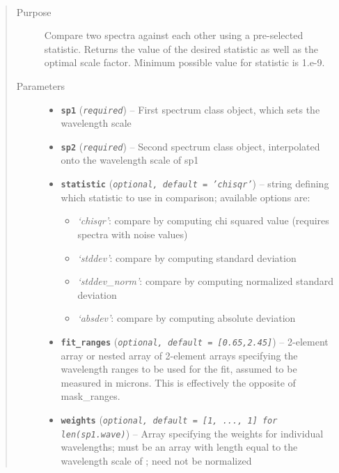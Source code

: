 \documentclass[letterpaper,10pt,english]{sphinxmanual}
\begin{document}
\begin{fulllineitems}
\label{api:splat.compareSpectra}~\begin{quote}\begin{description}
\item[{Purpose}] \leavevmode
Compare two spectra against each other using a pre-selected statistic. Returns the value of the desired statistic as well as the optimal scale factor. Minimum possible value for statistic is 1.e-9.

\item[{Parameters}] \leavevmode\begin{itemize}
\item {} 
\textbf{\texttt{sp1}} (\emph{\texttt{required}}) -- First spectrum class object, which sets the wavelength scale

\item {} 
\textbf{\texttt{sp2}} (\emph{\texttt{required}}) -- Second spectrum class object, interpolated onto the wavelength scale of sp1

\item {} 
\textbf{\texttt{statistic}} (\emph{\texttt{optional, default = 'chisqr'}}) -- 
string defining which statistic to use in comparison; available options are:
\begin{itemize}
\item {} 
\emph{`chisqr'}: compare by computing chi squared value (requires spectra with noise values)

\item {} 
\emph{`stddev'}: compare by computing standard deviation

\item {} 
\emph{`stddev\_norm'}: compare by computing normalized standard deviation

\item {} 
\emph{`absdev'}: compare by computing absolute deviation

\end{itemize}


\item {} 
\textbf{\texttt{fit\_ranges}} (\emph{\texttt{optional, default = {[}0.65,2.45{]}}}) -- 2-element array or nested array of 2-element arrays specifying the wavelength ranges to be used for the fit, assumed to be measured in microns. This is effectively the opposite of mask\_ranges.

\item {} 
\textbf{\texttt{weights}} (\emph{\texttt{optional, default = {[}1, ..., 1{]} for len(sp1.wave)}}) -- Array specifying the weights for individual wavelengths; must be an array with length equal to the wavelength scale of ; need not be normalized


\end{itemize}
\end{description}
\end{quote}
\end{fulllineitems}
\end{document}
